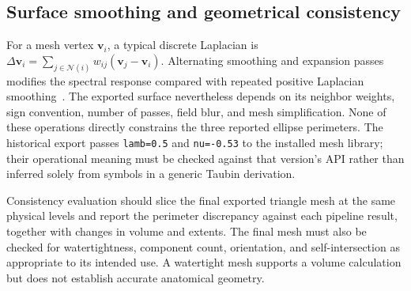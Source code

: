 \subsection{Surface smoothing and geometrical consistency}
For a mesh vertex $\mathbf v_i$, a typical discrete Laplacian is $\Delta\mathbf v_i=\sum_{j\in\mathcal N(i)}w_{ij}(\mathbf v_j-\mathbf v_i)$. Alternating smoothing and expansion passes modifies the spectral response compared with repeated positive Laplacian smoothing~\cite{taubin1995signal}. The exported surface nevertheless depends on its neighbor weights, sign convention, number of passes, field blur, and mesh simplification. None of these operations directly constrains the three reported ellipse perimeters. The historical export passes \texttt{lamb=0.5} and \texttt{nu=-0.53} to the installed mesh library; their operational meaning must be checked against that version's API rather than inferred solely from symbols in a generic Taubin derivation.

Consistency evaluation should slice the final exported triangle mesh at the same physical levels and report the perimeter discrepancy against each pipeline result, together with changes in volume and extents. The final mesh must also be checked for watertightness, component count, orientation, and self-intersection as appropriate to its intended use. A watertight mesh supports a volume calculation but does not establish accurate anatomical geometry.
